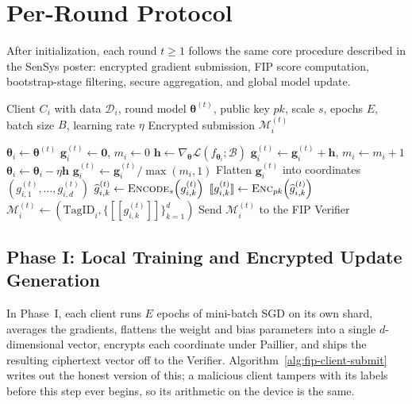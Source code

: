 \section{Per-Round Protocol}
\label{sec:fip-round}

After initialization, each round $t\ge 1$ follows the same core procedure described in the SenSys poster: encrypted gradient submission, FIP score computation, bootstrap-stage filtering, secure aggregation, and global model update.

\clearpage
\begin{algorithm}[H]
\caption{Client-Side Local Training and Encrypted Gradient Submission}
\label{alg:fip-client-submit}
\begin{algorithmic}[1]
\Require Client $C_i$ with data $\mathcal{D}_i$, round model $\boldsymbol{\theta}^{(t)}$, public key $pk$, scale $s$, epochs $E$, batch size $B$, learning rate $\eta$
\Ensure Encrypted submission $\mathcal{M}_i^{(t)}$

\State $\boldsymbol{\theta}_{i} \gets \boldsymbol{\theta}^{(t)}$
\State $\mathbf{g}_{i}^{(t)} \gets \mathbf{0}$, $m_i \gets 0$
        \State $\mathbf{h} \gets \nabla_{\boldsymbol{\theta}}\mathcal{L}\!\left(f_{\boldsymbol{\theta}_{i}};\mathcal{B}\right)$
        \State $\mathbf{g}_{i}^{(t)} \gets \mathbf{g}_{i}^{(t)} + \mathbf{h}$, $m_i \gets m_i + 1$
        \State $\boldsymbol{\theta}_{i} \gets \boldsymbol{\theta}_{i} - \eta \mathbf{h}$
    \EndFor
\EndFor
\State $\mathbf{g}_{i}^{(t)} \gets \mathbf{g}_{i}^{(t)} / \max(m_i,1)$
\State Flatten $\mathbf{g}_{i}^{(t)}$ into coordinates $\left(g_{i,1}^{(t)},\ldots,g_{i,d}^{(t)}\right)$
    \State $\widehat{g}_{i,k}^{(t)} \gets \textsc{Encode}_{s}\!\left(g_{i,k}^{(t)}\right)$
    \State $[\![g_{i,k}^{(t)}]\!] \gets \textsc{Enc}_{pk}\!\left(\widehat{g}_{i,k}^{(t)}\right)$
\EndFor
\State $\mathcal{M}_i^{(t)} \gets \left(\text{TagID}_i,\{[\![g_{i,k}^{(t)}]\!]\}_{k=1}^{d}\right)$
\State Send $\mathcal{M}_i^{(t)}$ to the FIP Verifier
\end{algorithmic}
\end{algorithm}

\subsection{Phase I: Local Training and Encrypted Update Generation}
\label{sec:fip-phaseI}

In Phase~I, each client runs $E$ epochs of mini-batch SGD on its own shard, averages the gradients, flattens the weight and bias parameters into a single $d$-dimensional vector, encrypts each coordinate under Paillier, and ships the resulting ciphertext vector off to the Verifier. Algorithm~\ref{alg:fip-client-submit} writes out the honest version of this; a malicious client tampers with its labels before this step ever begins, so its arithmetic on the device is the same.

